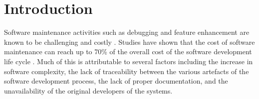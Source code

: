 
\setcounter{page}{1}

\chapter{Introduction}

Software maintenance activities such as debugging and feature enhancement are known to be challenging and costly \cite{Pressman2005}.
Studies have shown that the cost of software maintenance can reach up to 70\% of the overall cost of the software development life cycle \cite{HealthSocial2002}.
Much of this is attributable to several factors including the increase in software complexity, the lack of traceability between the various artefacts of the software development process, the lack of proper documentation,  and the unavailability of the original developers of the systems.

